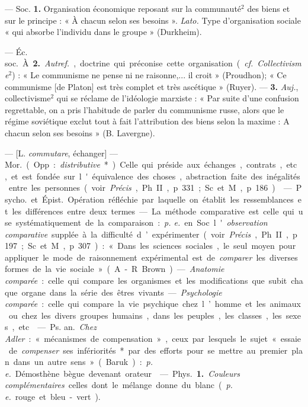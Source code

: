 \begin{itemize}[leftmargin=1cm, label=, itemsep=11pt]
 — Soc.  {\bf 1.} Organisation économique reposant sur la
communauté$^2$ des biens et sur le
principe : « À chacun selon ses besoins ». {\it Lato.} Type d'organisation
sociale « qui absorbe l’individu dans
le groupe » (Durkheim).

— \si{Éc. soc.} À. {\bf 2.} {\it Autref.}, doctrine
qui préconise cette organisation ({\it cf.} 
{\it Collectivisme}$^2$) : « Le communisme
ne pense ni ne raisonne,... il croit »
(Proudhon); « Ce communisme [de
Platon] est très complet et très ascétique » (Ruyer). — {\bf 3.} {\it Auj.}, collectivisme$^2$ qui se réclame de l’idéologie marxiste : « Par suite d’une
confusion regrettable, on a pris
l'habitude de parler du communisme russe, alors que le régime
soviétique exclut tout à fait l’attribution des biens selon la maxime :
A chacun selon ses besoins » (B. Lavergne).

 — [L. {\it commutare},
échanger] — \si{Mor.} (Opp. : {\it distributive}*). Celle qui préside aux échanges,
contrats, etc., et est fondée sur
l'équivalence des choses, abstraction faite des inégalités entre les
personnes (voir {\it Précis}, Ph. II,
p. 331; Sc. et M., p. 186).

 — \si{Psycho.} et \si{Épist.}
Opération réfléchie par laquelle on
établit les ressemblances et les différences entre deux termes. — La méthode comparative est celle qui use
systématiquement de la comparaison : {\it p. e.} en Soc. l'{\it observation comparative} supplée à la difficulté
d’expérimenter (voir {\it Précis}, Ph. II,
p. 197; Sc. et M., p. 307) : « Dans les
sciences sociales, le seul moyen pour
appliquer le mode de raisonnement
expérimental est de {\it comparer} les
diverses formes de la vie sociale »
(A.-R. Brown). — {\it Anatomie comparée} : celle qui compare les organismes et les modifications que
subit chaque organe dans la série
des êtres vivants. — {\it Psychologie
comparée} : celle qui compare la vie
psychique chez l’homme et les animaux ou chez les divers groupes
humains, dans les peuples, les
classes, les sexes, etc.

 — \si{Ps. an.} {\it Chez Adler} :
« mécanismes de compensation »,
ceux par lesquels le sujet « essaie de
{\it compenser} ses infériorités* par des
efforts pour se mettre au premier
plan dans un autre sens » (Baruk) :
{\it p. e.} Démosthène bègue devenant
orateur.

 — \si{Phys.} {\bf 1.} {\it Couleurs
complémentaires} celles dont le
mélange donne du blanc ({\it p. e.} rouge
et bleu-vert).


\end{itemize}
